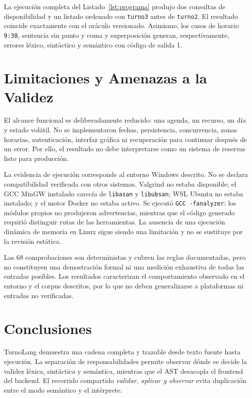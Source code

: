 \documentclass[runningheads]{llncs}
\begin{document}
La ejecución completa del Listado~\ref{lst:programa} produjo dos consultas de
disponibilidad y un listado ordenado con \texttt{turno3} antes de
\texttt{turno2}. El resultado coincide exactamente con el oráculo versionado.
Asimismo, los casos de horario \texttt{9:30}, sentencia sin punto y coma y
superposición generan, respectivamente, errores léxico, sintáctico y
semántico con código de salida 1.

\section{Limitaciones y Amenazas a la Validez}

El alcance funcional es deliberadamente reducido: una agenda, un recurso, un
día y estado volátil. No se implementaron fechas, persistencia, concurrencia,
zonas horarias, autenticación, interfaz gráfica ni recuperación para continuar
después de un error. Por ello, el resultado no debe interpretarse como un
sistema de reservas listo para producción.

La evidencia de ejecución corresponde al entorno Windows descrito. No se
declara compatibilidad verificada con otros sistemas. Valgrind no estaba
disponible; el GCC MinGW instalado carecía de \texttt{libasan} y
\texttt{libubsan}; WSL Ubuntu no estaba instalado; y el motor Docker no estaba
activo. Se ejecutó \texttt{GCC -fanalyzer}: los módulos propios no produjeron
advertencias, mientras que el código generado requirió distinguir rutas de las
herramientas. La ausencia de una ejecución dinámica de memoria en Linux sigue
siendo una limitación y no se sustituye por la revisión estática.

Las 68 comprobaciones son deterministas y cubren las reglas documentadas, pero
no constituyen una demostración formal ni una medición exhaustiva de todas las
entradas posibles. Los resultados caracterizan el comportamiento observado en
el entorno y el corpus descritos, por lo que no deben generalizarse a
plataformas ni entradas no verificadas.

\section{Conclusiones}

TurnoLang demuestra una cadena completa y trazable desde texto fuente hasta
ejecución. La separación de responsabilidades permite observar dónde se decide
la validez léxica, sintáctica y semántica, mientras que el AST desacopla el
frontend del backend. El recorrido compartido \emph{validar, aplicar y
observar} evita duplicación entre el modo semántico y el intérprete.
\end{document}
